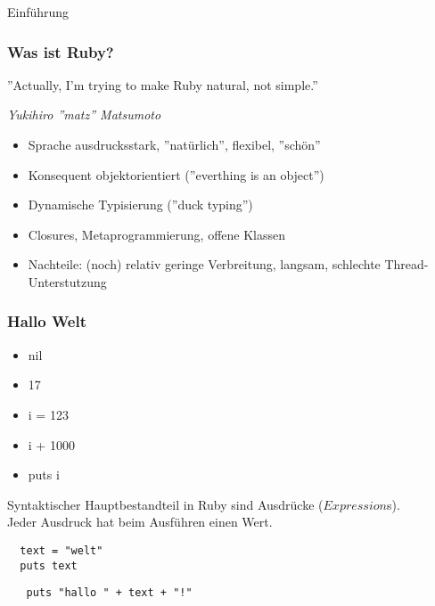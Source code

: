 \begin{frame}{Einführung}
\frametitle{Was ist Ruby?}

\begin{center}
''Actually, I'm trying to make Ruby natural, not simple.'' 
\end{center}
\begin{flushright}
\emph{Yukihiro ''matz'' Matsumoto}
\end{flushright}



\begin{itemize}
\pause \item Sprache ausdrucksstark\pause, ''natürlich''\pause, flexibel\pause, ''schön''
\pause \item Konsequent objektorientiert (''everthing is an object'')
\pause \item Dynamische Typisierung (''duck typing'')
\pause \item Closures, Metaprogrammierung, offene Klassen
\pause \item Nachteile: (noch) relativ geringe Verbreitung\pause,  langsam\pause, 
              schlechte Thread-Unterstutzung
\end{itemize}
\end{frame}

\begin{frame}[fragile]
  \frametitle{Hallo Welt}
  \begin{itemize}[<+->]
  \item nil
  \item 17
  \item i = 123
  \item i + 1000
  \item puts i
  \end{itemize}
  \pause
  Syntaktischer Hauptbestandteil in Ruby sind Ausdrücke ($Expression$s).\\
  Jeder Ausdruck hat beim Ausführen einen Wert.\\
  \pause
  \begin{lstlisting}
  text = "welt"
  puts text
  \end{lstlisting}
  \pause
  \lstinline|   puts "hallo " + text + "!"|
  

\begin{comment}
  \pause
  \lstinline|   puts "hallo #{text}!"| \hspace{5em}  (``String-Interpolation'')
\end{comment}

\end{frame}


